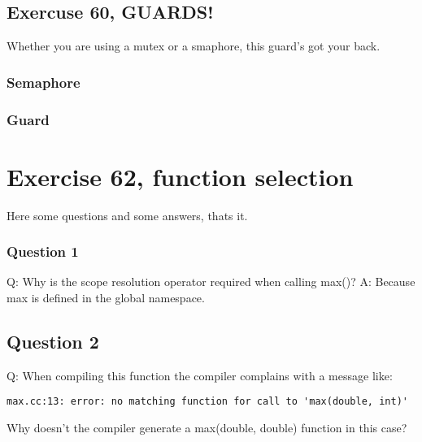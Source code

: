 \documentclass[11pt]{article}
\begin{document}
\subsection*{Exercuse 60, GUARDS!}
Whether you are using a mutex or a smaphore, this guard's got your back.





\subsubsection*{Semaphore}




\subsubsection*{Guard}






\section*{Exercise 62, function selection}
Here some questions and some answers, thats it.
\subsubsection*{Question 1}
Q: Why is the scope resolution operator required when calling max()?
A: Because max is defined in the global namespace.

\subsection*{Question 2}
Q: When compiling this function the compiler complains with a message like:
\begin{lstlisting}
max.cc:13: error: no matching function for call to 'max(double, int)'
\end{lstlisting}
Why doesn't the compiler generate a max(double, double) function in this case? 
\end{document}
